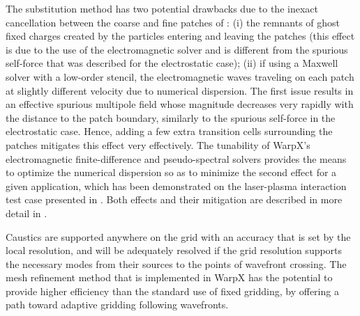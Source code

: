 The substitution method has two potential drawbacks due to the inexact cancellation between the coarse and fine patches of : (i) the remnants of ghost fixed charges created by the particles entering and leaving the patches (this effect is due to the use of the electromagnetic solver and is different from the spurious self-force that was described for the electrostatic case); (ii) if using a Maxwell solver with a low-order stencil, the electromagnetic waves traveling on each patch at slightly different velocity due to numerical dispersion.
The first issue results in an effective spurious multipole field whose magnitude decreases very rapidly with the distance to the patch boundary, similarly to the spurious self-force in the electrostatic case. Hence, adding a few extra transition cells surrounding the patches mitigates this effect very effectively.
The tunability of WarpX's electromagnetic finite-difference and pseudo-spectral solvers provides the means to optimize the numerical dispersion so as to minimize the second effect for a given application, which has been demonstrated on the laser-plasma interaction test case presented in \cite{Vaycpc04}.
Both effects and their mitigation are described in more detail in \cite{Vaycpc04}.

Caustics are supported anywhere on the grid with an accuracy that is set by the local resolution, and will be adequately resolved if the grid resolution supports the necessary  modes from their sources to the points of wavefront crossing. The mesh refinement method that is implemented in WarpX has the potential to provide higher efficiency than the standard use of fixed gridding, by offering a path toward adaptive gridding following wavefronts.

